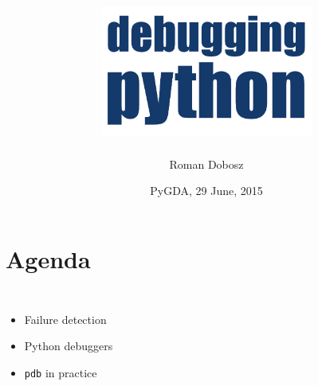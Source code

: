 \documentclass[14pt,notes,svgnames,aspectratio=169]{beamer}
\begin{document}
\title{%
    \includegraphics[width=7cm]{images/title.pdf}
}
\author{Roman Dobosz}
\date{PyGDA, 29 June, 2015}

\begin{frame}
  \titlepage
\end{frame}

\begingroup
    \section{Agenda}
\endgroup

\begin{frame}
    \begin{columns}
        \begin{itemize}[<+->]
            \item<1,2,3> Failure detection
            \item<2,3> Python debuggers
            \item<3> \lstinline{pdb} in practice
        \end{itemize}
        \centering
    \end{columns}
\end{frame}
\end{document}
